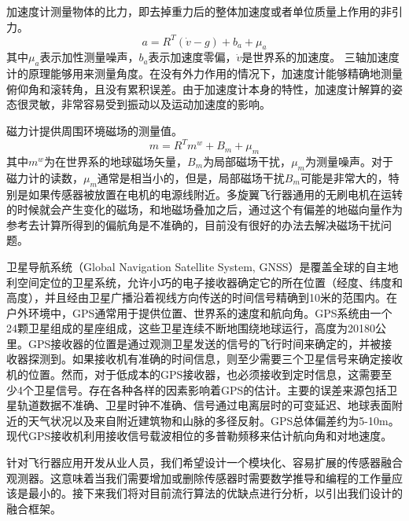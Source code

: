 \documentclass[
  type=master
]{gdutthesis}
\begin{document}
加速度计测量物体的比力，即去掉重力后的整体加速度或者单位质量上作用的非引力。
\begin{equation}\label{eq:accmodel}
	a=R^T(\dot{v}-g)+b_a+\mu_a
\end{equation}
其中$\mu_a$表示加性测量噪声，$b_a$表示加速度零偏，$\dot{v}$是世界系的加速度。
三轴加速度计的原理能够用来测量角度。在没有外力作用的情况下，加速度计能够精确地测量俯仰角和滚转角，且没有累积误差。由于加速度计本身的特性，加速度计解算的姿态很灵敏，非常容易受到振动以及运动加速度的影响\cite{赵翔2012基于}。

磁力计提供周围环境磁场的测量值。
\begin{equation}\label{eq:magmodel}
	m=R^T m^w+B_m+\mu_m
\end{equation}
其中$m^w$为在世界系的地球磁场矢量，$B_m$为局部磁场干扰，$\mu_m$为测量噪声。对于磁力计的读数，$\mu_m$通常是相当小的，但是，局部磁场干扰$B_m$可能是非常大的，特别是如果传感器被放置在电机的电源线附近。多旋翼飞行器通用的无刷电机在运转的时候就会产生变化的磁场，和地磁场叠加之后，通过这个有偏差的地磁向量作为参考去计算所得到的偏航角是不准确的，目前没有很好的办法去解决磁场干扰问题\cite{梅玲玉2019基于}。

卫星导航系统（Global Navigation Satellite System, GNSS）是覆盖全球的自主地利空间定位的卫星系统，允许小巧的电子接收器确定它的所在位置（经度、纬度和高度），并且经由卫星广播沿着视线方向传送的时间信号精确到10米的范围内。在户外环境中，GPS通常用于提供位置、世界系的速度和航向角。GPS系统由一个24颗卫星组成的星座组成，这些卫星连续不断地围绕地球运行，高度为20180公里。GPS接收器的位置是通过观测卫星发送的信号的飞行时间来确定的，并被接收器探测到。如果接收机有准确的时间信息，则至少需要三个卫星信号来确定接收机的位置。然而，对于低成本的GPS接收器，也必须接收到定时信息，这需要至少4个卫星信号。存在各种各样的因素影响着GPS的估计。主要的误差来源包括卫星轨道数据不准确、卫星时钟不准确、信号通过电离层时的可变延迟、地球表面附近的天气状况以及来自附近建筑物和山脉的多径反射。GPS总体偏差约为5-10m。现代GPS接收机利用接收信号载波相位的多普勒频移来估计航向角和对地速度\cite{wendel2006integrated}。

针对飞行器应用开发从业人员，我们希望设计一个模块化、容易扩展的传感器融合观测器。这意味着当我们需要增加或删除传感器时需要数学推导和编程的工作量应该是最小的。接下来我们将对目前流行算法的优缺点进行分析，以引出我们设计的融合框架。
\end{document}
